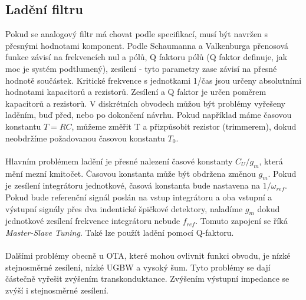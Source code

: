 \subsection{Ladění filtru}
\noindent Pokud se analogový filtr má chovat podle specifikací, musí být navržen s přesnými hodnotami komponent. Podle Schaumanna a Valkenburga \cite{13} přenosová funkce závisí na frekvencích nul a pólů, Q faktoru pólů (Q faktor definuje, jak moc je systém podtlumený), zesílení - tyto parametry zase závisí na přesné hodnotě součástek. Kritické frekvence s jednotkami 1/čas jsou určeny absolutními hodnotami kapacitorů a rezistorů. Zesílení a Q faktor je určen poměrem kapacitorů a rezistorů. V diskrétních obvodech můžou být problémy vyřešeny laděním, buď před, nebo po dokončení návrhu. Pokud například máme časovou konstantu $T = RC$, můžeme změřit T a přizpůsobit rezistor (trimmerem), dokud neobdržíme požadovanou časovou konstantu $T_0$.\\
\\
Hlavním problémem ladění je přesné nalezení časové konstanty $C_U/g_m$, která mění mezní kmitočet. Časovou konstanta může být obdržena změnou $g_m$. Pokud je zesílení integrátoru jednotkové, časová konstanta bude nastavena na $1/\omega _{ref}$. Pokud bude referenční signál poslán na vstup integrátoru a oba vstupní a výstupní signály přes dva indentické špičkové detektory, naladíme $g_m$ dokud jednotkové zesílení frekvence integrátoru nebude $f_{ref}$. Tomuto zapojení se říká \textit{Master-Slave Tuning}. Také lze použít ladění pomocí Q-faktoru. \\
\\
Dalšími problémy obecně u OTA, které mohou ovlivnit funkci obvodu, je nízké stejnosměrné zesílení, nízké UGBW a vysoký šum. Tyto problémy se dají částečně vyřešit zvýšením transkonduktance. Zvýšením výstupní impedance se zvýší i stejnosměrné zesílení.
